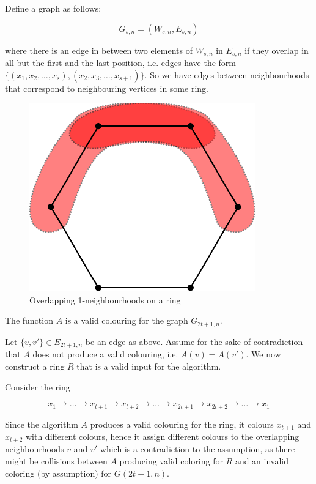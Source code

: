 Define a graph as follows:

\[G_{s,n} = (W_{s,n},E_{s,n})\]

where there is an edge in between two elements of $W_{s,n}$ in $E_{s,n}$ if they overlap in all but the first and the last position, i.e. edges have the form $\{(x_1,x_2,\ldots,x_s),(x_2,x_3,\ldots,x_{s+1})\}$. So we have edges between neighbourhoods that correspond to neighbouring vertices in some ring.

\begin{figure}[hbt]
\begin{center}
\includegraphics{./images/ring.pdf}
\end{center}
\caption{Overlapping 1-neighbourhoods on a ring}
\end{figure}

\begin{lem} The function $A$ is a valid colouring for the graph $G_{2t+1,n}$.\end{lem}

\begin{pr} Let $\{v,v'\}\in E_{2t+1,n}$ be an edge as above. Assume for the sake of contradiction that $A$ does not produce a valid colouring, i.e. $A(v)=A(v')$. We now construct a ring $R$ that is a valid input for the algorithm.

Consider the ring 

\[x_1\rightarrow \ldots \rightarrow x_{t+1} \rightarrow x_{t+2} \rightarrow \ldots \rightarrow x_{2t+1} \rightarrow x_{2t+2} \rightarrow \ldots \rightarrow x_1\] 


Since the algorithm $A$ produces a valid colouring for the ring, it colours $x_{t+1}$ and $x_{t+2}$ with different colours, hence it assign different colours to the overlapping neighbourhoods $v$ and $v'$ which is a contradiction to the assumption, as there might be collisions between $A$ producing valid coloring for $R$ and an invalid coloring (by assumption) for $G(2t+1, n)$.
\end{pr}

